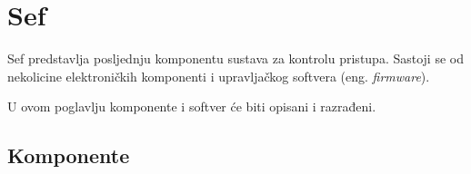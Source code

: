 \chapter{Sef}

Sef predstavlja posljednju komponentu sustava za kontrolu pristupa.
Sastoji se od nekolicine elektroničkih komponenti i upravljačkog softvera (eng. \textit{firmware}).

U ovom poglavlju komponente i softver će biti opisani i razrađeni.

\section{Komponente}

